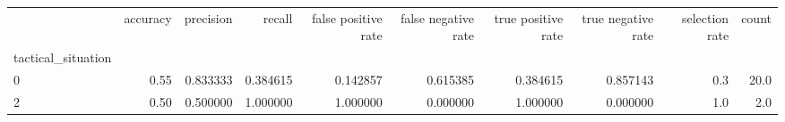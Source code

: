 \begin{tabular}{lrrrrrrrrr}
\toprule
{} &  accuracy &  precision &    recall &  false positive rate &  false negative rate &  true positive rate &  true negative rate &  selection rate &  count \\
tactical\_situation &           &            &           &                      &                      &                     &                     &                 &        \\
\midrule
0                  &      0.55 &   0.833333 &  0.384615 &             0.142857 &             0.615385 &            0.384615 &            0.857143 &             0.3 &   20.0 \\
2                  &      0.50 &   0.500000 &  1.000000 &             1.000000 &             0.000000 &            1.000000 &            0.000000 &             1.0 &    2.0 \\
\bottomrule
\end{tabular}
